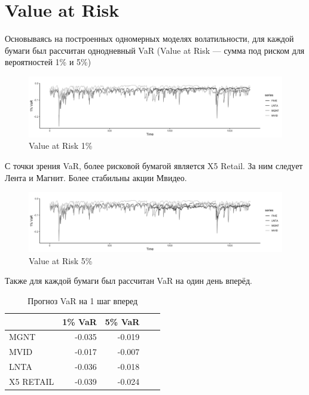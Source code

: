 \documentclass[a4paper,12pt,twoside]{article}
\begin{document}
\newpage
\section{Value at Risk}

Основываясь на построенных одномерных моделях волатильности, для каждой бумаги был рассчитан однодневный VaR (Value at Risk — сумма под риском для вероятностей 1\% и 5\%)


\begin{figure}[!h]
    \includegraphics[scale = 0.4]{var_1p.png}
    \caption{Value at Risk 1\%}
    \label{var_1p}
\end{figure}

С точки зрения VaR, более рисковой бумагой является X5 Retail.
За ним следует Лента и Магнит.
Более стабильны акции Мвидео.

\begin{figure}[!h]
    \includegraphics[scale = 0.4]{var_5p.png}
    \caption{Value at Risk 5\%}
    \label{var_5p}
\end{figure}




Также для каждой бумаги был рассчитан VaR на один день вперёд.

\begin{table}[!h]
\centering
\begin{tabular}{lrrrr}
  \hline
          & 1\% VaR & 5\% VaR \\
  \hline
  MGNT & -0.035 &  -0.019 \\
  MVID & -0.017 &  -0.007 \\
  LNTA & -0.036 &  -0.018 \\
  X5 RETAIL & -0.039 &  -0.024 \\
  \hline
\end{tabular}
\caption{Прогноз VaR на 1 шаг вперед}
\end{table}
\end{document}
